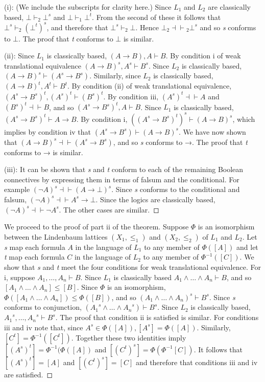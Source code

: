 \documentclass[
  10pt,
  letterpaper,
  DIV=11,
  numbers=noendperiod,
  twoside]{scrartcl}
\begin{document}
(i): (We include the subscripts for clarity here.) Since \(L_1\) and
\(L_2\) are classically based, \(\bot\vdash_2 \bot^s\) and
\(\bot \vdash_1 \bot^t\). From the second of these it follows that
\(\bot^s \vdash_2 (\bot^t)^s\), and therefore that
\(\bot^s \vdash_2 \bot\). Hence \(\bot_2\!{\dashv}{\vdash}\!_2 \bot^s\)
and so \emph{s} conforms to \(\bot\). The proof that \emph{t} conforms
to \(\bot\) is similar.

(ii): Since \(L_1\) is classically based,
\((A\rightarrow B),A \vdash B\). By condition i of weak translational
equivalence \((A\rightarrow B)^s, A^s \vdash B^s\). Since \(L_2\) is
classically based, \((A\rightarrow B)^s \vdash (A^s\rightarrow B^s)\).
Similarly, since \(L_2\) is classically based,
\((A\rightarrow B)^t,A^t \vdash B^t\). By condition (ii) of weak
translational equivalence,
\((A^s\rightarrow B^s)^t,(A^s)^t \vdash (B^s)^t\). By condition iii,
\((A^s)^t {\dashv}{\vdash}A\) and \((B^s)^t {\dashv}{\vdash}B\), and so
\((A^s\rightarrow B^s)^t,A \vdash B\). Since \(L_1\) is classically
based, \((A^s\rightarrow B^s)^t \vdash A\rightarrow B\). By condition i,
\(((A^s\rightarrow B^s)^t)^s \vdash (A\rightarrow B)^s\), which implies
by condition iv that \((A^s\rightarrow B^s) \vdash (A\rightarrow B)^s\).
We have now shown that
\((A\rightarrow B)^s{\dashv}{\vdash}(A^s\rightarrow B^s)\), and so
\emph{s} conforms to →. The proof that \emph{t} conforms to → is
similar.

(iii): It can be shown that \emph{s} and \emph{t} conform to each of the
remaining Boolean connectives by expressing them in terms of falsum and
the conditional. For example
\((\neg A)^s {\dashv}{\vdash} (A\rightarrow \bot)^s\). Since \emph{s}
conforms to the conditional and falsum,
\((\neg A)^s {\dashv}{\vdash} A^s \rightarrow \bot\). Since the logics
are classically based, \((\neg A)^s {\dashv}{\vdash} \neg A^s\). The
other cases are similar.~◻

We proceed to the proof of part ii of the theorem. Suppose \(\Phi\) is
an isomorphism between the Lindenbaum lattices \((X_1,\le _1)\) and
\((X_2,\le _2)\) of \(L_1\) and \(L_2\). Let \emph{s} map each formula
\(A\) in the language of \(L_1\) to any member of \(\Phi([A])\) and let
\emph{t} map each formula \(C\) in the language of \(L_2\) to any member
of \(\Phi^{-1}([C])\). We show that \emph{s} and \emph{t} meet the four
conditions for weak translational equivalence. For i, suppose
\(A_1,{\ldots},A_n \vdash B\). Since \(L_1\) is classically based
\(A_1\wedge {\ldots}\wedge A_n \vdash B\), and so
\([A_1\wedge {\ldots}\wedge A_n] \le [B]\). Since \(\Phi\) is an
isomorphism, \(\Phi([A_1\wedge {\ldots}\wedge A_n]) \le \Phi([B])\), and
so \((A_1\wedge {\ldots}\wedge A_n)^s \vdash B^s\). Since \emph{s}
conforms to conjunction,
\(({A_1}^s\wedge {\ldots}\wedge {A_n}^s) \vdash B^s\). Since \(L_2\) is
classically based, \({A_1}^s,{\ldots},{A_n}^s \vdash B^s\). The proof
that condition ii is satisfied is similar. For conditions iii and iv
note that, since \(A^s \in \Phi([A]), [A^s]= \Phi([A])\). Similarly,
\([C^t]= \Phi^{-1}([C^t])\). Together these two identities imply
\([(A^s)^t] = \Phi^{-1}(\Phi([A])\) and
\([(C^t)^s]= \Phi(\Phi^{-1}[C])\). It follows that \([(A^s)^t] = [A]\)
and \([(C^t)^s]=[C]\) and therefore that conditions iii and iv are
satisfied.~◻
\end{document}
